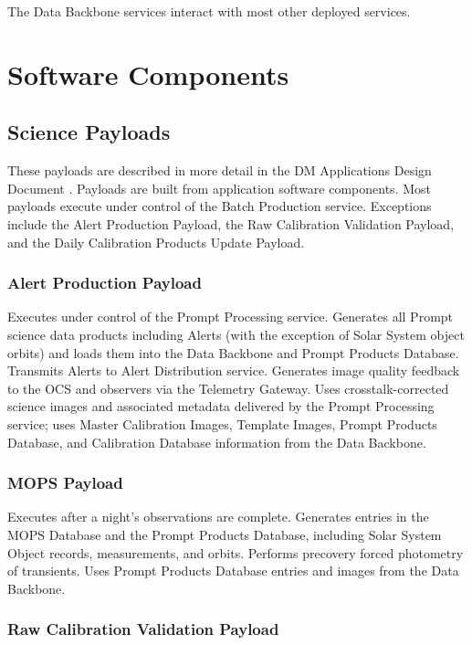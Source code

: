 \documentclass[DM,toc,lsstdraft]{lsstdoc}
\begin{document}
The Data Backbone services interact with most other deployed services.


\section{Software Components}\label{software-components}

\subsection{Science Payloads}\label{science-payloads}

These payloads are described in more detail in the DM Applications Design Document .
Payloads are built from application software components.
Most payloads execute under control of the Batch Production service.
Exceptions include the Alert Production Payload, the Raw Calibration Validation Payload, and the Daily Calibration Products Update Payload.

\subsubsection{Alert Production Payload}\label{alert-production-payload}

Executes under control of the Prompt Processing service. Generates all
Prompt science data products including Alerts (with the exception of
Solar System object orbits) and loads them into the Data Backbone and
Prompt Products Database. Transmits Alerts to Alert Distribution service.
Generates image quality feedback to the OCS and observers via the
Telemetry Gateway. Uses crosstalk-corrected science images and
associated metadata delivered by the Prompt Processing service; uses
Master Calibration Images, Template Images, Prompt Products Database, and
Calibration Database information from the Data Backbone.

\subsubsection{MOPS Payload}\label{mops-payload}

Executes after a night's
observations are complete. Generates entries in the MOPS Database and
the Prompt Products Database, including Solar System Object records,
measurements, and orbits. Performs precovery forced photometry of
transients. Uses Prompt Products Database entries and images from the Data
Backbone.

\subsubsection{Raw Calibration Validation
Payload}\label{raw-calibration-validation-payload}
\end{document}
